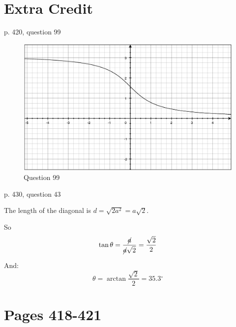 \documentclass[fleqn,addpoints]{exam}
\newcommand{\degree}{\ensuremath{^\circ}}
\begin{document}
\section{Extra Credit}
\begin{itemize*}
  \item p. 420, question 99

\begin{solution}
\begin{figure}[H]
  \centering
  \includegraphics[scale=.3]{question_99.eps}
  \caption*{Question 99}
\end{figure}

\end{solution}

  \item p. 430, question 43

\begin{solution}
The length of the diagonal is $d = \sqrt{2 a^2} = a \sqrt{2}$.  

So 
\[
  \tan \theta = \frac{\cancel{a}}{\cancel{a} \sqrt{2}} = \frac{\sqrt{2}}{2}
\]

And:
\[
  \theta = \arctan \frac{\sqrt{2}}{2} = 35.3 \degree
\]

\end{solution}

\end{itemize*}

\ifprintanswers
\section{Pages 418-421}
\end{document}
